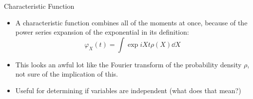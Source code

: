 \documentclass{beamer}
\begin{document}
\begin{frame}{Characteristic Function}
  \begin{itemize}
  \item A characteristic function combines all of the moments at once, because of the power series expansion of the exponential in its definition:
    \begin{equation}
      \varphi_X(t)=\int\exp{iXt}\rho(X)\dd{X}
    \end{equation}
  \item This looks an awful lot like the Fourier transform of the probability density $\rho$, not sure of the implication of this.
  \item Useful for determining if variables are independent (what does that mean?)
  \end{itemize}
\end{frame}

\end{document}
